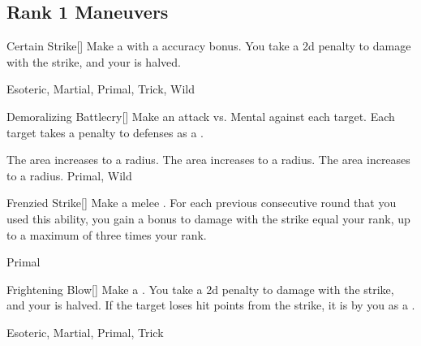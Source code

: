 \subsection{Rank 1 Maneuvers}

\lowercase{\hypertarget{maneuver:Certain Strike}{}}\label{maneuver:Certain Strike}
\hypertarget{maneuver:Certain Strike}{}
\begin{freeability}[Rank 1]{Certain Strike}[]
Make a  with a  accuracy bonus.
You take a \minus2d penalty to damage with the strike, and your  is halved.


 Esoteric, Martial, Primal, Trick, Wild
\end{freeability}
\vspace{0.25em}



\lowercase{\hypertarget{maneuver:Demoralizing Battlecry}{}}\label{maneuver:Demoralizing Battlecry}
\hypertarget{maneuver:Demoralizing Battlecry}{}
\begin{freeability}[Rank 1]{Demoralizing Battlecry}[]
Make an attack vs. Mental against each target.
\hit Each target takes a  penalty to defenses as a .

\rankline
{} The area increases to a \areamed radius.
 The area increases to a \arealarge radius.
 The area increases to a \areahuge radius.
 Primal, Wild
\end{freeability}
\vspace{0.25em}



\lowercase{\hypertarget{maneuver:Frenzied Strike}{}}\label{maneuver:Frenzied Strike}
\hypertarget{maneuver:Frenzied Strike}{}
\begin{freeability}[Rank 1]{Frenzied Strike}[]
Make a melee .
For each previous consecutive round that you used this ability, you gain a bonus to damage with the strike equal your rank, up to a maximum of three times your rank.


 Primal
\end{freeability}
\vspace{0.25em}



\lowercase{\hypertarget{maneuver:Frightening Blow}{}}\label{maneuver:Frightening Blow}
\hypertarget{maneuver:Frightening Blow}{}
\begin{freeability}[Rank 1]{Frightening Blow}[]
Make a .
You take a \minus2d penalty to damage with the strike, and your  is halved.
If the target loses hit points from the strike, it is  by you as a .


 Esoteric, Martial, Primal, Trick
\end{freeability}
\vspace{0.25em}



